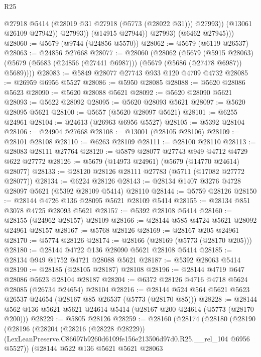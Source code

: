 \begin{lexlean}{R25}
\begin{coremodule}
                      @27918
                      @5414
                      (@28019 @31 @27918 (@5773 (@28022 @31)))
                      @27993))
                  (@13061 @26109 @27942))
                @27993))
            (@14915 @27944))
          @27993)
        (@6462 @27945)))
@28060 := @5679 (@9744 (@24856 @5570))
@28062 := @5679 (@6119 @26537)
@28063 := @24856 @27668
@28077 := @28060
    (@28062
      (@5679
        (@5915 @28063)
        (@5679 (@5683 (@24856 (@27441 @6987))) (@5679 (@5686 (@27478 @6987)) @5689))))
@28083 := @5849 @28077 @27743 @933 @120 @4709 @4732
@28085 := @26959 @6956 @5527
@28086 := @5950 @28085
@28088 := @5620 @28086 @5623
@28090 := @5620 @28088 @5621
@28092 := @5620 @28090 @5621
@28093 := @5622 @28092
@28095 := @5620 @28093 @5621
@28097 := @5620 @28095 @5621
@28100 := @5657 (@5620 @28097 @5621)
@28101 := @6255 @24961
@28104 := @24613 (@26963 @6956 @5527)
@28105 := @5392 @28104
@28106 := @24904 @27668
@28108 := @13001 (@28105 @28106)
@28109 := @28101 @28108
@28110 := @6263 @28109
@28111 := @28100 @28110
@28113 := @28083 @28111 @27764
@28120 := @5879 @28077 @27743 @949 @4712 @4729 @622 @27772
@28126 := @5679 (@14973 @24961) (@5679 (@14770 @24614) @28077)
@28133 := @28120 @28126 @28111 @27783 (@5711 (@17082 @27772 @28077))
@28134 := @6224 @28126
@28143 := @28134 @1407 @3276 @4728 @28097 @5621 (@5392 @28109 @5414) @28110
@28144 := @5759 @28126
@28150 := @28144 @4726 @136 @28095 @5621 @28109 @5414
@28155 := @28134 @851 @3078 @4725 @28093 @5621
@28157 := @5392 @28108 @5414
@28160 := @28155 (@24962 @28157) @28109
@28166 := @28144 @585 @4724 @5621 @28092 @24961 @28157
@28167 := @5768 @28126
@28169 := @28167 @205 @24961
@28170 := @5774 @28126
@28174 := @28166 (@28169 (@5773 (@28170 @205)))
@28180 := @28144 @4722 @136 @28090 @5621 @28108 @5414
@28185 := @28134 @949 @1752 @4721 @28088 @5621
@28187 := @5392 @28063 @5414
@28190 := @28185 (@28105 @28187) @28108
@28196 := @28144 @4719 @647 @28086 @5623 @28104 @28187
@28204 := @6372 @28126 @4716 @4718 @5624 @28085 (@26734 @24654) @28104
@28216 := @28144 @524 @564 @5621 @5623 @26537 @24654 (@28167 @85 @26537 (@5773 (@28170 @85)))
@28228 := @28144 @562 @136 @5621 @5621 @24614 @5414 (@28167 @200 @24614 (@5773 (@28170 @200)))
@28229 := @5805 @28126
@28259 := @28160
    (@28174
      (@28180
        (@28190
          (@28196
            (@28204
              (@28216 (@28228 @28229))
              (LexLeanPreserve.C86697b9260d6109fe156e213506d97d0.R25.__rel_104 @6956 @5527))
            (@28144
              @522
              @136
              @5621
              @5621
              @28063

\end{coremodule}
\end{lexlean}
